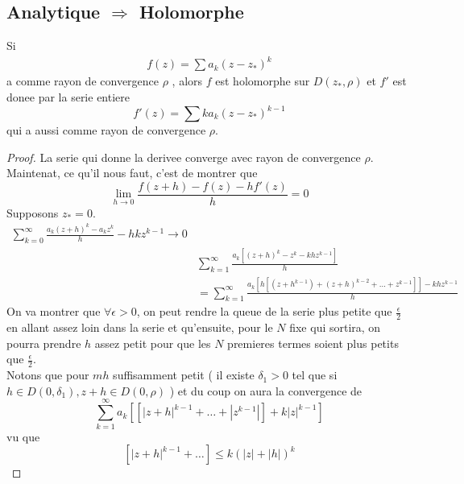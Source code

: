 \documentclass[../main.tex]{subfiles}
\begin{document}
\subsection{Analytique $\Rightarrow$ Holomorphe}
\begin{propo}
	Si
	\begin{align*}
		f( z) = \sum a_k ( z-z_*) ^{k}
	\end{align*}
	a comme rayon de convergence $ \rho$ , alors $f$ est holomorphe sur $D( z_*, \rho) $ et $f'$ est donee par la serie entiere
	\[ 
		f'( z) = \sum k a_k ( z-z_*) ^{k-1}
	\]
	qui a aussi comme rayon de convergence $\rho$.
\end{propo}
\begin{proof}
La serie qui donne la derivee converge avec rayon de convergence $\rho$. Maintenat, ce qu'il nous faut, c'est de montrer que
\[ 
	\lim_{h \to 0} \frac{f( z+h) - f( z) - hf'( z) }{h}=0
\]
Supposons $z_*=0$.
\begin{align*}
	\sum_{k=0}^{ \infty } \frac{a_k ( z+h) ^{k}- a_k z^{k}}{h}-h k z^{k-1}\to 0\\
&	\sum_{k=1}^{ \infty } \frac{a_k [ ( z+h) ^{k}- z^{k}- kh z^{k-1}] }{h}\\
&= \sum_{k=1}^{ \infty }\frac{a_k [ h [ ( z+h^{k-1})+ ( z+h) ^{k-2}+ \ldots + z^{k-1} ] ] - kh z^{k-1}}{h}
\end{align*}
On va montrer que $\forall \epsilon>0$, on peut rendre la queue de la serie plus petite que $\frac{\epsilon}{2}$ en allant assez loin dans la serie et qu'ensuite, pour le $N$ fixe qui sortira, on pourra prendre $h$ assez petit pour que les $N$ premieres termes soient plus petits que $ \frac{\epsilon}{2}$.\\
Notons que pour $mh$ suffisamment petit ( il existe $\delta_1>0$ tel que si $h \in D( 0, \delta_1), z +h \in D( 0, \rho) $ ) et du coup on aura la convergence de
\[ 
\sum_{k=1}^{ \infty }a_k [ [ |z+h|^{k-1}+ \ldots + |z^{k-1}|]+ k |z|^{k-1} ] 
\]
vu que
\[ 
	[ |z+h|^{k-1}+ \ldots] \leq  k ( |z|+|h|) ^{k}
\]




\end{proof}

		
\end{document}
